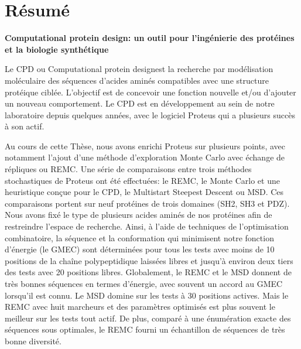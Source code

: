

\section*{Résumé}

{\large\bf\noindent Computational protein design: un outil pour l’ingénierie des protéines et la biologie synthétique}

\bigskip

Le CPD ou \og Computational protein design\fg est la recherche par modélisation moléculaire des séquences d’acides aminés compatibles avec une structure protéique ciblée. L’objectif est de concevoir une fonction nouvelle et/ou d’ajouter un nouveau comportement. Le CPD est en développement au sein de notre laboratoire depuis quelques années, avec le logiciel Proteus qui a plusieurs succès à son actif.

Au cours de cette Thèse, nous avons enrichi Proteus sur plusieurs points, avec notamment l’ajout d’une méthode d’exploration Monte Carlo avec échange de répliques ou REMC. Une série de comparaisons entre trois méthodes stochastiques de Proteus ont été effectuées: le REMC, le Monte Carlo et une heuristique conçue pour le CPD, le \og Multistart Steepest Descent \fg ou MSD. Ces comparaisons portent sur neuf protéines de trois domaines (SH2, SH3 et PDZ). Nous avons fixé le type de plusieurs acides aminés de nos protéines afin de restreindre l’espace de recherche. Ainsi, à l'aide de techniques de l'optimisation combinatoire, la séquence et la conformation qui minimisent notre fonction d’énergie (le GMEC) sont déterminées pour tous les tests avec moins de 10 positions de la chaîne polypeptidique laissées libres et jusqu’à environ deux tiers des tests avec 20 positions libres. Globalement, le REMC et le MSD donnent de très bonnes séquences en termes d’énergie, avec souvent un accord au GMEC lorsqu’il est connu. Le MSD domine sur les tests à 30 positions actives. Mais le REMC avec huit marcheurs et des paramètres optimisés est plus souvent le meilleur sur les tests tout actif. De plus, comparé à une énumération exacte des séquences sous optimales, le REMC fourni un échantillon de séquences de très bonne diversité.

